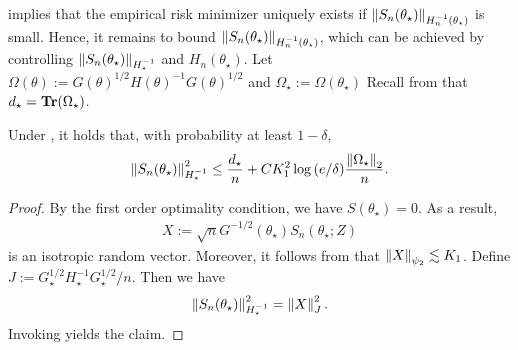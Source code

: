  implies that the empirical risk minimizer uniquely exists if $\left\lVert S_n(\theta_\star) \right\rVert_{H_n^{-1}(\theta_\star)}$ is small.
Hence, it remains to bound $\left\lVert S_n(\theta_\star) \right\rVert_{H_n^{-1}(\theta_\star)}$, which can be achieved by controlling $\left\lVert S_n(\theta_\star) \right\rVert_{H_\star^{-1}}$ and $H_n(\theta_\star)$.
Let $\Omega(\theta) := G(\theta)^{1/2} H(\theta)^{-1} G(\theta)^{1/2}$ and $\Omega_\star := \Omega(\theta_\star)$
Recall from  that $d_\star = \operatorname{\bf Tr}(\Omega_\star)$.
\begin{lemma}\label{lem:score}
    Under , it holds that, with probability at least $1 - \delta$,
    \begin{align*}
        \left\lVert S_n(\theta_\star) \right\rVert_{H_\star^{-1}}^{2} \le \frac{d_\star}n + C K_{1}^2 \log{(e / \delta)} \frac{\left\lVert \Omega_\star \right\rVert_2}{n}.
    \end{align*}
\end{lemma}
\begin{proof}
    By the first order optimality condition, we have $S(\theta_\star) = 0$.
    As a result,
    \begin{align*}
        X := \sqrt{n} G^{-1/2}(\theta_\star) S_n(\theta_\star; Z)
    \end{align*}
    is an isotropic random vector.
    Moreover, it follows from  that $\left\lVert X \right\rVert_{\psi_2} \lesssim K_{1}$.
    Define $J := G^{1/2}_\star H_\star^{-1} G^{1/2}_\star / n$.
    Then we have
    \begin{align*}
        \left\lVert S_n(\theta_\star) \right\rVert_{H_\star^{-1}}^{2} = \left\lVert X \right\rVert_{J}^2.
    \end{align*}
    Invoking  yields the claim.
\end{proof}


